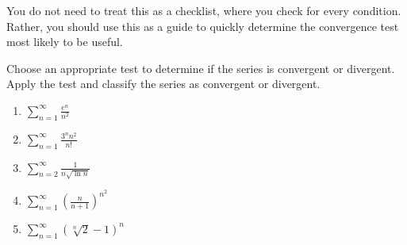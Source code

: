 You do not need to treat this as a checklist, where you check for every 
condition. Rather, you should use this as a guide to quickly determine the 
convergence test most likely to be useful. 

\begin{Exercise}[label = test]
Choose an appropriate test to determine if the series is convergent or 
divergent. Apply the test and classify the series as convergent or divergent.
\begin{enumerate}
\item $\sum_{n=1}^\infty \frac{e^n}{n^2}$
\item $\sum_{n=1}^\infty \frac{3^n n^2}{n!}$
\item $\sum_{n=2}^\infty \frac{1}{n\sqrt{\ln{n}}}$
\item $\sum_{n=1}^\infty \left( \frac{n}{n+1} \right)^{n^2}$
\item $\sum_{n=1}^\infty \left( \sqrt[n]{2} - 1\right)^n$
\end{enumerate}
\vspace{75mm}
\end{Exercise}

